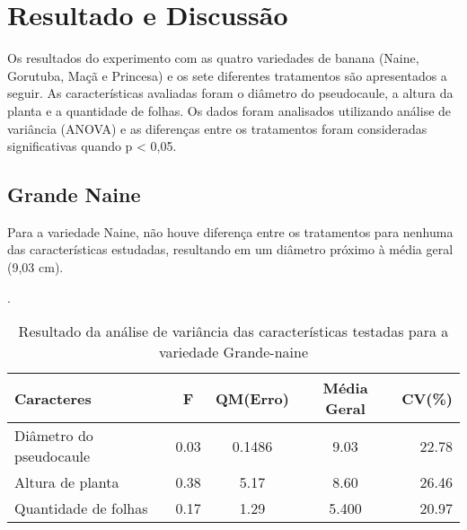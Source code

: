 \chapter{Resultado e Discussão}

Os resultados do experimento com as quatro variedades de banana (Naine, Gorutuba, Maçã e Princesa) e os sete diferentes tratamentos são apresentados a seguir. As características avaliadas foram o diâmetro do pseudocaule, a altura da planta e a quantidade de folhas. Os dados foram analisados utilizando análise de variância (ANOVA) e as diferenças entre os tratamentos foram consideradas significativas quando p < 0,05.
\section{Grande Naine}

Para a variedade Naine, não houve diferença entre os tratamentos para nenhuma das características estudadas, resultando em um diâmetro próximo à média geral (9,03 cm). 

\begin{table}[!htb]
 	\begin{center}
 		\caption{Resultado da análise de variância das características testadas para a variedade Grande-naine}.
	 	\begin{tabular*}{\textwidth}{@{\extracolsep{\fill}}lcccr}
 		\toprule
 		\toprule
 		\textbf{Caracteres} & \textbf{F}  & \textbf{QM(Erro)} & \textbf{Média Geral} &\textbf {CV(\%)} \\
		\hline
		Diâmetro do pseudocaule & 0.03 & 0.1486 & 9.03 &  22.78 \\
		Altura de planta &0.38 &5.17 & 8.60 &26.46 \\
		Quantidade de folhas &0.17  &1.29 &5.400 & 20.97\\
		\hline
		\hline
 		\end{tabular*}\\
 	\end{center}
\end{table}